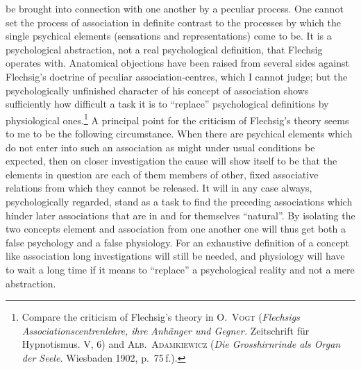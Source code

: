 \documentclass[12pt,a4paper]{book}
\newcommand{\opage}[1]{\marginnote{\footnotesize\textit{[#1]}}}
\begin{document}
be brought into connection with one another by a peculiar process. One cannot
set the process of association in definite contrast to the processes by which
the single psychical elements (sensations and representations) come to be. \opage{17}It is
a psychological abstraction, not a real psychological definition, that Flechsig
operates with. Anatomical objections have been raised from several sides against
Flechsig's doctrine of peculiar association-centres, which I cannot judge; but
the psychologically unfinished character of his concept of association shows
sufficiently how difficult a task it is to ``replace'' psychological definitions
by physiological ones.\footnote{Compare the criticism of Flechsig's theory in
\textsc{O.~Vogt} (\textit{Flechsigs Associationscentrenlehre, ihre Anhänger und
Gegner.} Zeitschrift für Hypnotismus. V, 6) and \textsc{Alb.~Adamkiewicz}
(\textit{Die Grosshirnrinde als Organ der Seele.} Wiesbaden 1902, p.~75\,f.).}
A principal point for the criticism of Flechsig's theory seems to me to be the
following circumstance. When there are psychical elements which do not enter
into such an association as might under usual conditions be expected, then on
closer investigation the cause will show itself to be that the elements in
question are each of them members of other, fixed associative relations from
which they cannot be released. It will in any case always, psychologically
regarded, stand as a task to find the preceding associations which hinder later
associations that are in and for themselves ``natural''. By isolating the two
concepts element and association from one another one will thus get both a false
psychology and a false physiology. For an exhaustive definition of a concept
like association long investigations will still be needed, and physiology will
have to wait a long time if it means to ``replace'' a psychological reality and
not a mere abstraction.
\end{document}

